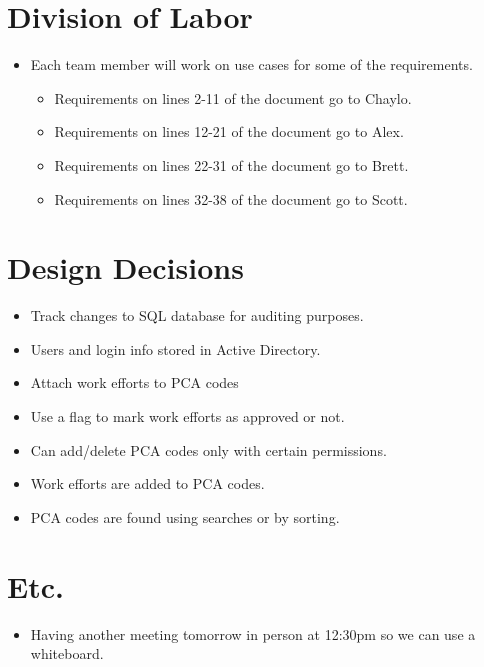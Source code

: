 \documentclass{article}
\begin{document}
\section{Division of Labor}
\begin{itemize}
\item Each team member will work on use cases for some of the requirements.
	\begin{itemize}
	\item Requirements on lines 2-11 of the document go to Chaylo.
	\item Requirements on lines 12-21 of the document go to Alex.
	\item Requirements on lines 22-31 of the document go to Brett.
	\item Requirements on lines 32-38 of the document go to Scott.
	\end{itemize}
\end{itemize}

\section{Design Decisions}
\begin{itemize}
\item Track changes to SQL database for auditing purposes.
\item Users and login info stored in Active Directory.
\item Attach work efforts to PCA codes
\item Use a flag to mark work efforts as approved or not.
\item Can add/delete PCA codes only with certain permissions.
\item Work efforts are added to PCA codes.
\item PCA codes are found using searches or by sorting.
\end{itemize}

\section{Etc.}
\begin{itemize}
\item Having another meeting tomorrow in person at 12:30pm so we can use a whiteboard.
\end{itemize}
\end{document}
